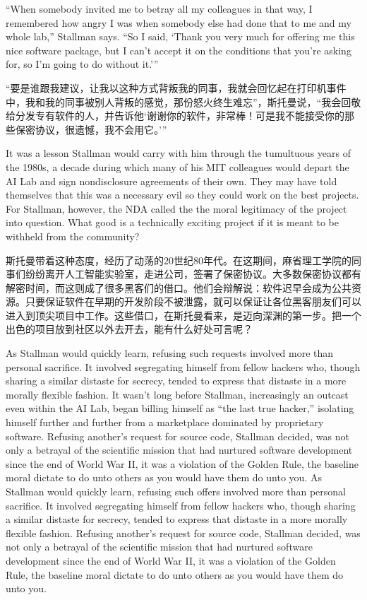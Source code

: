 \ifdefined\eng
``When somebody invited me to betray all my colleagues in that way, I remembered how angry I was when somebody else had done that to me and my whole lab,'' Stallman says. ``So I said, `Thank you very much for offering me this nice software package, but I can't accept it on the conditions that you're asking for, so I'm going to do without it.'\hspace{0.01in}''
\fi

\ifdefined\chs
``要是谁跟我建议，让我以这种方式背叛我的同事，我就会回忆起在打印机事件中，我和我的同事被别人背叛的感觉，那份怒火终生难忘''，斯托曼说，``我会回敬给分发专有软件的人，并告诉他`谢谢你的软件，非常棒！可是我不能接受你的那些保密协议，很遗憾，我不会用它。'\hspace{0.01in}''
\fi

\ifdefined\vtwo
\ifdefined\eng
It was a lesson Stallman would carry with him through the tumultuous years of the 1980s, a decade during which many of his MIT colleagues would depart the AI Lab and sign nondisclosure agreements of their own. They may have told themselves that this was a necessary evil so they could work on the best projects. For Stallman, however, the NDA called the the moral legitimacy of the project into question. What good is a technically exciting project if it is meant to be withheld from the community?
\fi

\ifdefined\chs
斯托曼带着这种态度，经历了动荡的20世纪80年代。在这期间，麻省理工学院的同事们纷纷离开人工智能实验室，走进公司，签署了保密协议。大多数保密协议都有解密时间，而这则成了很多黑客们的借口。他们会辩解说：软件迟早会成为公共资源。只要保证软件在早期的开发阶段不被泄露，就可以保证让各位黑客朋友们可以进入到顶尖项目中工作。这些借口，在斯托曼看来，是迈向深渊的第一步。把一个出色的项目放到社区以外去开去，能有什么好处可言呢？
\fi
\fi

\ifdefined\eng
\ifdefined\vone
As Stallman would quickly learn, refusing such requests involved more than personal sacrifice. It involved segregating himself from fellow hackers who, though sharing a similar distaste for secrecy, tended to express that distaste in a more morally flexible fashion. It wasn't long before Stallman, increasingly an outcast even within the AI Lab, began billing himself as ``the last true hacker,'' isolating himself further and further from a marketplace dominated by proprietary software. Refusing another's request for source code, Stallman decided, was not only a betrayal of the scientific mission that had nurtured software development since the end of World War II, it was a violation of the Golden Rule, the baseline moral dictate to do unto others as you would have them do unto you.
\fi
\ifdefined\vtwo
As Stallman would quickly learn, refusing such offers involved more than personal sacrifice. It involved segregating himself from fellow hackers who, though sharing a similar distaste for secrecy, tended to express that distaste in a more morally flexible fashion. Refusing another's request for source code, Stallman decided, was not only a betrayal of the scientific mission that had nurtured software development since the end of World War II, it was a violation of the Golden Rule, the baseline moral dictate to do unto others as you would have them do unto you.
\fi
\fi

